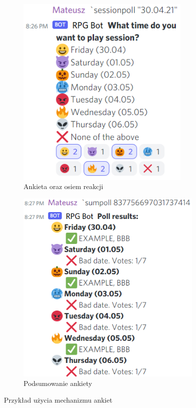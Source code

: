 \documentclass[shortabstract,inz]{iithesis}
\begin{document}
			\begin{figure}[h!]
				\centering
				\begin{subfigure}[b]{.49\textwidth}
					\centering
					\includegraphics[width=0.93\textwidth]{poll_content}
					\caption{Ankieta oraz osiem reakcji}
				\end{subfigure}
				\hfill
				\begin{subfigure}[b]{.49\textwidth}
					\centering
					\includegraphics[width=1\textwidth]{poll_results}
					\caption{Podsumowanie ankiety}
				\end{subfigure}
				\caption{Przykład użycia mechanizmu ankiet}
				\label{sessionPoll}
			\end{figure}
	
\end{document}
